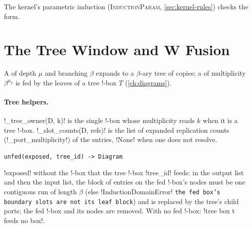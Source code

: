 The kernel's parametric induction (\textsc{InductionParam}, \cref{sec:kernel-rules}) checks the form.

\section{The Tree Window and W Fusion}\label{sec:kernel-tree}

A  of depth $\mu$ and branching $\beta$ expands to a $\beta$-ary tree of copies; a  of multiplicity $\beta^{\mu_T}$ is fed by the leaves of a tree !-box $T$ (\cref{ch:diagrams}).

\paragraph{Tree helpers.} \py!_tree_owner(D, k)! is the single !-box whose multiplicity reads $k$ when it is a tree !-box. \py!_slot_counts(D, refs)! is the list of expanded replication counts (\py!_port_multiplicity!) of the entries, \py!None! when one does not resolve.

\begin{signature}
\texttt{unfed(\allowbreak{}exposed,\allowbreak{} tree\_\allowbreak{}id) -> Diagram}

\code!exposed! without the !-box that the tree !-box \code!tree_id! feeds: in the output list and then the input list, the block of entries on the fed !-box's nodes must be one contiguous run of length $\beta$ (else \py!InductionDomainError! \texttt{the fed box's boundary slots are not its leaf block}) and is replaced by the tree's child ports; the fed !-box and its nodes are removed. With no fed !-box: \code!tree box t feeds no box!.
\end{signature}

